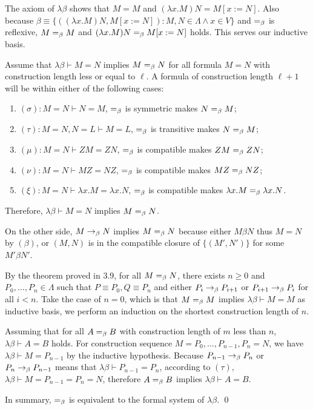 \begin{pf} \rm
 The axiom of $\lambda\beta$ shows that $M=M$ and $(\lambda x.M)N=M[x:=N]$.
 Also because $\beta\equiv \{((\lambda x.M)N, M[x:=N]): M,N\in\Lambda \land x\in V\} $
 and $=_{\beta}$ is reflexive, $M=_{\beta} M$ and $(\lambda x.M)N=_{\beta} M[x:=N]$ holds.
 This serves our inductive basis.
  
 Assume that $\lambda\beta \vdash M=N$ implies $M=_{\beta} N$ for all formula
 $M=N$ with construction length less or equal to $\ell$.
 A formula of construction length $\ell + 1$ will be within either of the following cases:

\begin{enumerate}
 \item $(\sigma): M=N\vdash N=M$, $=_{\beta}$ is symmetric makes
$N=_{\beta} M$;
 \item $(\tau): M=N, N=L\vdash M=L$,
 $=_{\beta}$ is transitive makes $N=_{\beta} M$;
 \item $(\mu): M=N\vdash ZM=ZN$, $=_{\beta}$ is compatible makes
 $ZM=_{\beta} ZN$;
 \item $(\nu): M=N\vdash MZ=NZ$, $=_{\beta}$ is compatible makes
 $MZ=_{\beta} NZ$;
 \item $(\xi): M=N\vdash \lambda x.M=\lambda x.N$, $=_{\beta}$ is compatible makes
 $\lambda x.M =_{\beta} \lambda x.N$.
\end{enumerate}

 Therefore, $\lambda\beta \vdash M=N$ implies $M=_{\beta} N$.

 On the other side,
 $M\rightarrow_{\beta} N$ implies $M=_{\beta} N$ because either $M\beta N$ thus $M=N$ by $(\beta)$,
 or $(M,N)$ is in the compatible closure of $\{(M',N')\}$ for some $M'\beta N'$.
 
 By the theorem proved in 3.9, 
 for all $M=_{\beta} N$, there exists $n\geq 0$ and $P_0,\ldots,P_n\in\Lambda$
 such that $P\equiv P_0, Q\equiv P_n$ and either $P_i\rightarrow_{\beta} P_{i+1}$ or
 $P_{i+1} \rightarrow_{\beta} P_{i}$ for all $i<n$. Take the case of $n=0$, which is
 that $M=_{\beta} M$ implies $\lambda\beta \vdash M=M$ as inductive basis,
 we perform an induction on the shortest construction length of $n$.

 Assuming that for all $A=_{\beta} B$ with construction length of $m$ less than $n$,
 $\lambda\beta\vdash A=B$ holds.
 For construction sequence $M = P_0,\ldots,P_{n-1},P_n = N$,
 we have $\lambda\beta\vdash M = P_{n-1}$ by the inductive hypothesis.
 Because $P_{n-1}\rightarrow_{\beta} P_n$ or $P_{n}\rightarrow_{\beta} P_{n-1}$ means that
 $\lambda\beta\vdash P_{n-1} = P_n$, according to $(\tau)$, $\lambda\beta\vdash M = P_{n-1} = P_n = N$,
 therefore $A=_{\beta} B$ implies $\lambda\beta\vdash A=B$.

 In summary, $=_{\beta}$ is equivalent to the formal system of $\lambda\beta$.
\qed
\end{pf}
